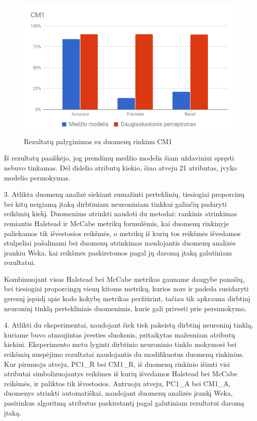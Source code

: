 \documentclass{VUMIFPSbakalaurinis}
\begin{document}
\begin{figure}[H]
    \centering
    \includegraphics[scale=0.5]{img/chart-2}
    \caption{Rezultatų palyginimas su duomenų rinkinu CM1}
    \label{img:chart2}
\end{figure}

Iš rezultatų paaiškėjo, jog prendimų medžio modelis šiam uždaviniui spręsti nebuvo tinkamas. Dėl didelio atributų kiekio, šiuo atveju 21 atributas, įvyko modelio permokymas.

3. Atlikta duomenų analizė siekiant sumažinti perteklinių, tiesiogiai proporcinų bei kitų neigiamą įtaką dirbtiniam neuroniniam tinkkui galinčių padaryti reikšmių kiekį. Duomenims atrinkti naudoti du metodai: rankinis atrinkimas remiantis Halstead ir McCabe metrikų formulėmis, kai duomenų rinkinyje paliekamos tik išvestosios reikšmės, o metrikų iš kurių tos reikšmės išvedamos stulpeliai pašalinami bei duomenų atrinkimas naudojantis duomenų analizės įrankiu Weka, kai reikšmės paskirstomos pagal jų daromą įtaką galutiniam rezultatui.

Kombinuojant visas Halstead bei McCabe metrikas gauname daugybe panašių, bei tiesiogiai proporcingų vienų kitoms metrikų, kurios nors ir padeda susidaryti geresnį įspūdį apie kodo kokybę metrikas peržiūrint, tačiau tik apkrauna dirbtinį neuroninį tinklą pertekliniais duomenimis, kurie gali privesti prie persimokymo.

4. Atlikti du eksperimentai, naudojant šiek tiek pakeistą dirbtinį neuroninį tinklą, kuriame buvo atnaujintas įvesties sluoksnis, pritaikytas mažesniam atributų kiekiui. Eksperimento metu lyginti dirbtinio neuroninio tinklo mokymosi bei reikšmių nuspėjimo rezultatai naudojantis du modifikuotus duomenų rinkinius. Kur pirmuoju atveju, PC1\_R bei CM1\_R, iš duomenų rinkinio išimti visi atributai simbolizuojantys reikšmes iš kurių išvedamos Halstead bei McCabe reikšmės, ir paliktos tik išvestosios. Antruoju atveju, PC1\_A bei CM1\_A, duomenys atrinkti automatiškai, naudojant duomenų analizės įrankį Weka, pasirinkus algoritmą atributus paskirstantį pagal galutiniam rezultatui daromą įtaką.
\end{document}
